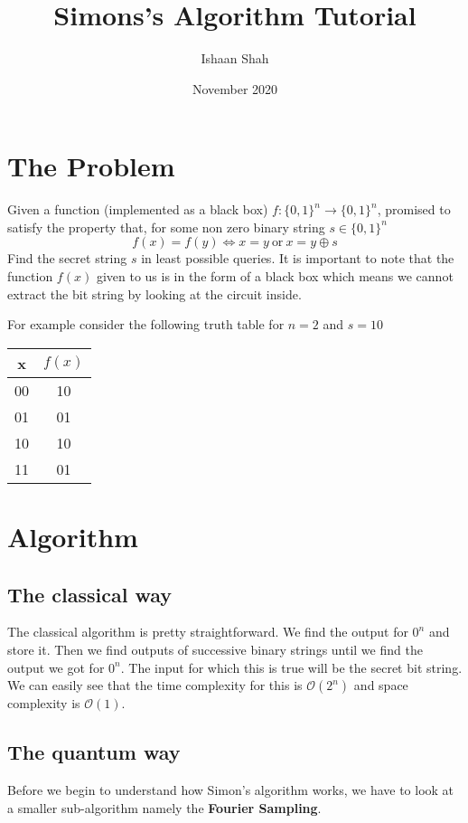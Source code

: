 \documentclass[13pt]{article}
\title{Simons's Algorithm Tutorial}
\author{Ishaan Shah}
\date{November 2020}
\begin{document}
\maketitle

\section{The Problem}
\indent Given a function (implemented as a black box) $f: \{0, 1\}^n \rightarrow \{0, 1\}^n$, promised to satisfy the property that, for some non zero binary string $s \in \{0, 1\}^n$
$$f(x) = f(y) \Leftrightarrow x = y\ \text{or}\ x = y \oplus s$$
Find the secret string $s$ in least possible queries. It is important to note that the function $f(x)$ given to us is in the form of a black box which means we cannot extract the bit string by looking at the circuit inside.

For example consider the following truth table for $n = 2$ and $s=10$
\begin{center}
    \begin{tabular}{|c|c|}
        \hline
        x & $f(x)$ \\
        \hline
        00 & 10 \\
        01 & 01 \\
        10 & 10 \\
        11 & 01 \\
        \hline
    \end{tabular}
\end{center}


\section{Algorithm}
\subsection{The classical way}
\indent The classical algorithm is pretty straightforward. We find the output for $0^n$ and store it. Then we find outputs of successive binary strings until we find the output we got for $0^n$. The input for which this is true will be the secret bit string. We can easily see that the time complexity for this is $\mathcal{O}(2^n)$ and space complexity is $\mathcal{O}(1)$.

\subsection{The quantum way}
Before we begin to understand how Simon's algorithm works, we have to look at a smaller sub-algorithm namely the \textbf{Fourier Sampling}.
\end{document}
